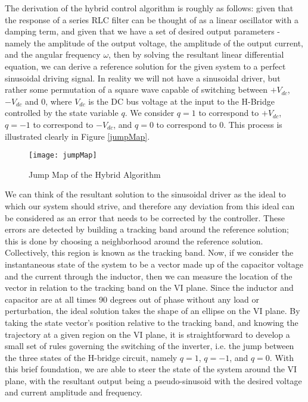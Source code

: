 The derivation of the hybrid control algorithm is roughly as follows: given that the response of a series RLC filter can be thought of as a linear oscillator with a damping term, and given that we have a set of desired output parameters - namely the amplitude of the output voltage, the amplitude of the output current, and the angular frequency $\omega$, then by solving the resultant linear differential equation, we can derive a reference solution for the given system to a perfect sinusoidal driving signal. In reality we will not have a sinusoidal driver, but rather some permutation of a square wave capable of switching between $+V_{dc}$, $-V_{dc}$ and $0$, where $V_{dc}$ is the DC bus voltage at the input to the H-Bridge controlled by the state variable $q$. We consider $q=1$ to correspond to $+V_{dc}$, $q=-1$ to correspond to $-V_{dc}$, and $q=0$ to correspond to $0$. This process is illustrated clearly in Figure \ref{jumpMap}.

\begin{figure}[htbp]
\begin{center}
\texttt{[image: jumpMap]}
\caption{Jump Map of the Hybrid Algorithm \cite{ricardo}}
\label{jump}
\end{center}
\end{figure}

We can think of the resultant solution to the sinusoidal driver as the ideal to which our system should strive, and therefore any deviation from this ideal can be considered as an error that needs to be corrected by the controller. These errors are detected by building a tracking band around the reference solution; this is done by choosing a neighborhood around the reference solution. Collectively, this region is known as the tracking band. Now, if we consider the instantaneous state of the system to be a vector made up of the capacitor voltage and the current through the inductor, then we can measure the location of the vector in relation to the tracking band on the VI plane. Since the inductor and capacitor are at all times 90 degrees out of phase without any load or perturbation, the ideal solution takes the shape of an ellipse on the VI plane. By taking the state vector's position relative to the tracking band, and knowing the trajectory at a given region on the VI plane, it is straightforward to develop a small set of rules governing the switching of the inverter, i.e. the jump between the three states of the H-bridge circuit, namely $q=1$, $q=-1$, and $q=0$. With this brief foundation, we are able to steer the state of the system around the VI plane, with the resultant output being a pseudo-sinusoid with the desired voltage and current amplitude and frequency. 

